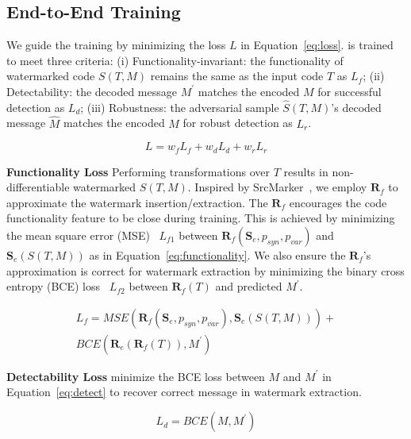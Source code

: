 \subsection{\sys{} End-to-End Training}
We guide the training by minimizing the loss $L$ in Equation~\ref{eq:loss}. 
\sys{} is trained to meet three criteria: (i) Functionality-invariant: the functionality of watermarked code $S(T, M)$ remains the same as the input code $T$ as $L_f$; (ii) Detectability: the decoded message $M^\prime$ matches the encoded $M$ for successful detection as $L_d$; (iii) Robustness: the adversarial sample $\hat{S}(T, M)$'s decoded message $\hat{M}$ matches the encoded $M$ for robust detection as $L_r$. 


\begin{equation}
\label{eq:loss}
L = w_f L_f + w_d L_d + w_r L_r
\end{equation}


\textbf{Functionality Loss} Performing transformations over $T$ results in non-differentiable watermarked $S(T, M)$. Inspired by SrcMarker~\cite{yang2024srcmarker}, we employ $\textbf{R}_f$ to approximate the watermark insertion/extraction. The $\textbf{R}_f$ encourages the code functionality feature to be close during training. This is achieved by minimizing the mean square error (MSE)~\cite{allen1971mean} $L_{f1}$ between $\textbf{R}_f (\mathbf{S}_e, p_{syn}, p_{var})$ and $\textbf{S}_e (S(T, M))$ as in Equation~\ref{eq:functionality}. We also ensure the $\textbf{R}_f$'s approximation is correct for watermark extraction by minimizing the binary cross entropy (BCE) loss~\cite{ruby2020binary} $L_{f2}$ between $\textbf{R}_f(T)$ and predicted $M^\prime$.


\begin{equation}
\label{eq:functionality}
\begin{array}{rr}
L_f = MSE(\textbf{R}_f (\mathbf{S}_e, p_{syn}, p_{var}), \textbf{S}_e (S(T, M))) + \\ BCE(\textbf{R}_e(\textbf{R}_f(T)), M^\prime)
\end{array}
\end{equation}


\textbf{Detectability Loss} \sys{} minimize the BCE loss between $M$ and $M^\prime$ in Equation~\ref{eq:detect} to recover correct message in watermark extraction.

\begin{equation}
\label{eq:detect}
L_d = BCE(M, M^\prime)
\end{equation}

